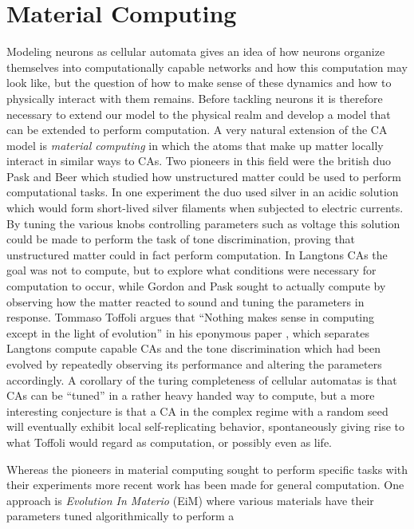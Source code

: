 \section{Material Computing}
Modeling neurons as cellular automata gives an idea of how neurons organize
themselves into computationally capable networks and how this computation may
look like, but the question of how to make sense of these dynamics and how to
physically interact with them remains.
Before tackling neurons it is therefore necessary to extend our model to the physical
realm and develop a model that can be extended to perform computation.
A very natural extension of the CA model is \emph{material computing} in which
the atoms that make up matter locally interact in similar ways to CAs.
%
Two pioneers in this field were the british duo Pask and Beer which studied how
unstructured matter could be used to perform computational tasks.
%
In one experiment \cite{PASK59} the duo used silver in an acidic solution which
would form short-lived silver filaments when subjected to electric currents.
%
By tuning the various knobs controlling parameters such as voltage this solution
could be made to perform the task of tone discrimination, proving that
unstructured matter could in fact perform computation.
%
In Langtons CAs the goal was not to compute, but to explore what conditions were
necessary for computation to occur, while Gordon and Pask sought to actually
compute by observing how the matter reacted to sound and tuning the parameters
in response.
%
Tommaso Toffoli argues that ``Nothing makes sense in computing except in the
light of evolution'' in his eponymous paper
\cite{TOFFOLI04}, which separates Langtons compute capable
CAs and the tone discrimination which had been evolved by repeatedly observing
its performance and altering the parameters accordingly.
%
A corollary of the turing completeness of cellular automatas is that CAs can be
``tuned'' in a rather heavy handed way to compute, but a more interesting
conjecture is that a CA in the complex regime with a random seed will eventually
exhibit local self-replicating behavior, spontaneously giving rise to what
Toffoli would regard as computation, or possibly even as life.\par
%
Whereas the pioneers in material computing sought to perform specific tasks with
their experiments more recent work has been made for general computation. One
approach is \emph{Evolution In Materio} (EiM) \cite{MILLER_EI2014} where various
materials have their parameters tuned algorithmically to perform a
